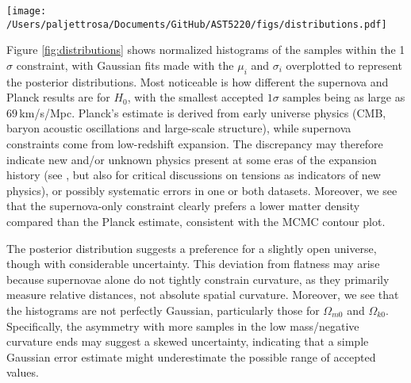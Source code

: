 \documentclass{aa}
\numberwithin{equation}{section}
\numberwithin{table}{section}
\numberwithin{figure}{section}
\begin{document}

\begin{figure*}
  \centering
  \texttt{[image: /Users/paljettrosa/Documents/GitHub/AST5220/figs/distributions.pdf]}
  \caption{Histograms of the MCMC posterior distributions for the parameters $(H_0,\Omega_{m0}, \Omega_{k0}, \Omega_{\Lambda0})$, compared with Gaussian fits (solid curves) and Planck values. Deviations from Gaussianity indicate asymmetries in parameter uncertainties.}\label{fig:distributions}
\end{figure*}

Figure \ref{fig:distributions} shows normalized histograms of the samples within the 1$\sigma$ constraint, with Gaussian fits made with the $\mu_i$ and $\sigma_i$ overplotted to represent the posterior distributions. Most noticeable is how different the supernova and Planck results are for $H_0$, with the smallest accepted $1\sigma$ samples being as large as $69\,$km/s/Mpc. Planck's estimate is derived from early universe physics (CMB, baryon acoustic oscillations and large-scale structure), while supernova constraints come from low-redshift expansion. The discrepancy may therefore indicate new and/or unknown physics present at some eras of the expansion history (see \cite{JWST}, but also \cite{tensions} for critical discussions on tensions as indicators of new physics), or possibly systematic errors in one or both datasets. Moreover, we see that the supernova-only constraint clearly prefers a lower matter density compared than the Planck estimate, consistent with the MCMC contour plot.

The posterior distribution suggests a preference for a slightly open universe, though with considerable uncertainty. This deviation from flatness may arise because supernovae alone do not tightly constrain curvature, as they primarily measure relative distances, not absolute spatial curvature. Moreover, we see that the histograms are not perfectly Gaussian, particularly those for $\Omega_{m0}$ and $\Omega_{k0}$. Specifically, the asymmetry with more samples in the low mass/negative curvature ends may suggest a skewed uncertainty, indicating that a simple Gaussian error estimate might underestimate the possible range of accepted values. 
\end{document}
